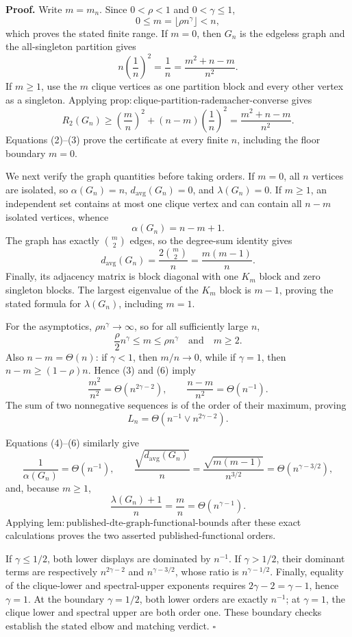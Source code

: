 \textbf{Proof.}
Write \(m=m_n\).  Since \(0<\rho<1\) and \(0<\gamma\leq1\),
\[
0\leq m=\lfloor\rho n^{\gamma}\rfloor< n,
\tag{1}
\]
which proves the stated finite range.  If \(m=0\), then \(G_n\) is the edgeless graph and the all-singleton partition gives
\[
n\left(\frac1n\right)^2=\frac1n
=\frac{m^2+n-m}{n^2}.
\tag{2}
\]
If \(m\geq1\), use the \(m\) clique vertices as one partition block and every other vertex as a singleton.  Applying \(\mathrm{prop{:}clique\text{-}partition\text{-}rademacher\text{-}converse}\) gives
\[
R_2(G_n)\geq
\left(\frac mn\right)^2+(n-m)\left(\frac1n\right)^2
=\frac{m^2+n-m}{n^2}.
\tag{3}
\]
Equations (2)--(3) prove the certificate at every finite \(n\), including the floor boundary \(m=0\).

We next verify the graph quantities before taking orders.  If \(m=0\), all \(n\) vertices are isolated, so \(\alpha(G_n)=n\), \(d_{\mathrm{avg}}(G_n)=0\), and \(\lambda(G_n)=0\).  If \(m\geq1\), an independent set contains at most one clique vertex and can contain all \(n-m\) isolated vertices, whence
\[
\alpha(G_n)=n-m+1.
\tag{4}
\]
The graph has exactly \(\binom m2\) edges, so the degree-sum identity gives
\[
d_{\mathrm{avg}}(G_n)=\frac{2\binom m2}{n}=\frac{m(m-1)}n.
\tag{5}
\]
Finally, its adjacency matrix is block diagonal with one \(K_m\) block and zero singleton blocks.  The largest eigenvalue of the \(K_m\) block is \(m-1\), proving the stated formula for \(\lambda(G_n)\), including \(m=1\).

For the asymptotics, \(\rho n^{\gamma}\to\infty\), so for all sufficiently large \(n\),
\[
\frac{\rho}{2}n^{\gamma}\leq m\leq\rho n^{\gamma}
\quad\text{and}\quad m\geq2.
\tag{6}
\]
Also \(n-m=\Theta(n)\): if \(\gamma<1\), then \(m/n\to0\), while if \(\gamma=1\), then \(n-m\geq(1-\rho)n\).  Hence (3) and (6) imply
\[
\frac{m^2}{n^2}=\Theta(n^{2\gamma-2}),
\qquad
\frac{n-m}{n^2}=\Theta(n^{-1}).
\tag{7}
\]
The sum of two nonnegative sequences is of the order of their maximum, proving
\[
L_n=\Theta\!\left(n^{-1}\vee n^{2\gamma-2}\right).
\tag{8}
\]

Equations (4)--(6) similarly give
\[
\frac1{\alpha(G_n)}=\Theta(n^{-1}),
\qquad
\frac{\sqrt{d_{\mathrm{avg}}(G_n)}}n
=\frac{\sqrt{m(m-1)}}{n^{3/2}}
=\Theta(n^{\gamma-3/2}),
\tag{9}
\]
and, because \(m\geq1\),
\[
\frac{\lambda(G_n)+1}{n}=\frac mn=\Theta(n^{\gamma-1}).
\tag{10}
\]
Applying \(\mathrm{lem{:}published\text{-}dte\text{-}graph\text{-}functional\text{-}bounds}\) after these exact calculations proves the two asserted published-functional orders.

If \(\gamma\leq1/2\), both lower displays are dominated by \(n^{-1}\).  If \(\gamma>1/2\), their dominant terms are respectively \(n^{2\gamma-2}\) and \(n^{\gamma-3/2}\), whose ratio is \(n^{\gamma-1/2}\).  Finally, equality of the clique-lower and spectral-upper exponents requires \(2\gamma-2=\gamma-1\), hence \(\gamma=1\).  At the boundary \(\gamma=1/2\), both lower orders are exactly \(n^{-1}\); at \(\gamma=1\), the clique lower and spectral upper are both order one.  These boundary checks establish the stated elbow and matching verdict. \(\square\)